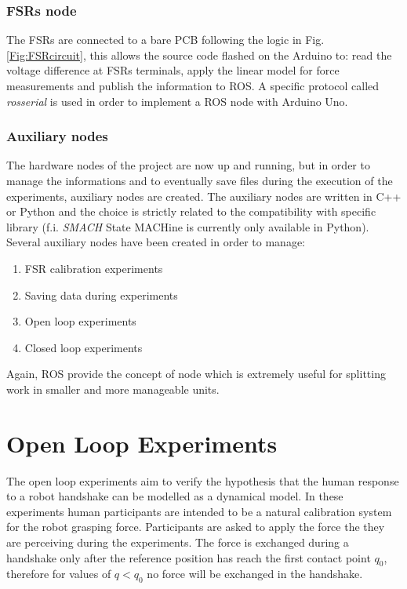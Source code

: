 \subsection{FSRs node}
The FSRs are connected to a bare PCB following the logic in Fig. \ref{Fig:FSRcircuit}, this allows the source code flashed on the Arduino to: read the voltage difference at FSRs terminals, apply the linear model for force measurements and publish the information to ROS. A specific protocol called \textit{rosserial} is used in order to implement a ROS node with Arduino Uno.\\

\subsection{Auxiliary nodes}
The hardware nodes of the project are now up and running, but in order to manage the informations and to eventually save files during the execution of the experiments, auxiliary nodes are created.
The auxiliary nodes are written in C++ or Python and the choice is strictly related to the compatibility with specific library (f.i. \textit{SMACH} State MACHine is currently only available in Python).
Several auxiliary nodes have been created in order to manage:
\begin{enumerate}
\item FSR calibration experiments
\item Saving data during experiments
\item Open loop experiments
\item Closed loop experiments
\end{enumerate}
Again, ROS provide the concept of node which is extremely useful for splitting work in smaller and more manageable units.\\

\chapter{Open Loop Experiments}
The open loop experiments aim to verify the hypothesis that the human response to a robot handshake can be modelled as a dynamical model. In these experiments human participants are intended to be a natural calibration system for the robot grasping force. Participants are asked to apply the force the they are perceiving during the experiments.
The force is exchanged during a handshake only after the reference position has reach the first contact point $q_0$, therefore for values of $q < q_0$ no force will be exchanged in the handshake.

